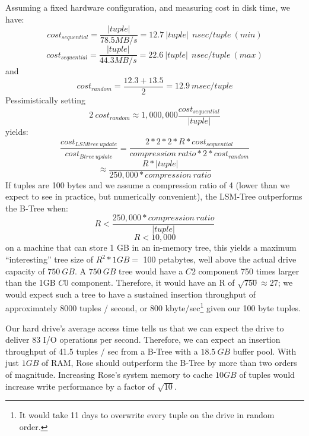 \documentclass{vldb}
\newcommand{\rows}{Rose\xspace}
\newcommand{\rowss}{Rose's\xspace}
\begin{document}

Assuming a fixed hardware configuration, and measuring cost in disk
time, we have:
\[
   cost_{sequential}=\frac{|tuple|}{78.5MB/s}=12.7~|tuple|~~nsec/tuple~(min)
\]
\[
   cost_{sequential}=\frac{|tuple|}{44.3MB/s}=22.6~|tuple|~~nsec/tuple~(max)
\]
and
\[
   cost_{random}=\frac{12.3+13.5}{2} = 12.9~msec/tuple
\]
Pessimistically setting
\[
2~cost_{random}\approx1,000,000\frac{cost_{sequential}}{|tuple|}
\] yields: \[
    \frac{cost_{LSMtree~update}}{cost_{Btree~update}}=\frac{2*2*2*R*cost_{sequential}}{compression~ratio*2*cost_{random}}
\]
\[
   \approx\frac{R*|tuple|}{250,000*compression~ratio}
\]
If tuples are 100 bytes and we assume a compression ratio of 4 (lower
than we expect to see in practice, but numerically convenient), the
LSM-Tree outperforms the B-Tree when:
\[
    R < \frac{250,000*compression~ratio}{|tuple|}
\]
\[
    R < 10,000
\]
on a machine that can store 1 GB in an in-memory tree, this yields a
maximum ``interesting'' tree size of $R^2*1GB = $ 100 petabytes, well
above the actual drive capacity of $750~GB$.  A $750~GB$ tree would
have a $C2$ component 750 times larger than the 1GB $C0$ component.
Therefore, it would have an R of $\sqrt{750}\approx27$; we would
expect such a tree to have a sustained insertion throughput of
approximately 8000 tuples / second, or 800 kbyte/sec\footnote{It would
  take 11 days to overwrite every tuple on the drive in random order.}
given our 100 byte tuples.

Our hard drive's average access time tells
us that we can expect the drive to deliver 83 I/O operations per
second.  Therefore, we can expect an insertion throughput of 41.5
tuples / sec from a B-Tree with a $18.5~GB$ buffer pool.  With just $1GB$ of RAM, \rows should outperform the
B-Tree by more than two orders of magnitude.  Increasing \rowss system
memory to cache $10 GB$ of tuples would increase write performance by a
factor of $\sqrt{10}$.
\end{document}
